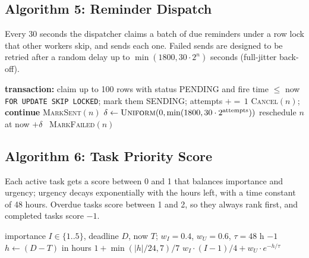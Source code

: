 \subsection{Algorithm 5: Reminder Dispatch}
Every 30 seconds the dispatcher claims a batch of due reminders under a row lock that other workers skip, and sends each one. Failed sends are designed to be retried after a random delay up to $\min(1800, 30 \cdot 2^{n})$ seconds (full-jitter back-off).
\begin{algorithm}[H]
\caption{Reminder dispatch (application/reminders/dispatcher.py)}
\begin{algorithmic}[1]
\State \textbf{transaction:} claim up to 100 rows with status PENDING and fire time $\le$ now \texttt{FOR UPDATE SKIP LOCKED}; mark them SENDING; attempts $+{=}\,1$
   \textsc{Cancel}$(n)$; \textbf{continue} \EndIf
   \textsc{MarkSent}$(n)$
  \Else
    \State $\delta \gets \textsc{Uniform}(0, \min(1800, 30 \cdot 2^{\text{attempts}}))$
     reschedule $n$ at now $+ \delta$ \Else\ \textsc{MarkFailed}$(n)$ \EndIf
  \EndIf
\EndFor
\end{algorithmic}
\end{algorithm}

\subsection{Algorithm 6: Task Priority Score}
Each active task gets a score between 0 and 1 that balances importance and urgency; urgency decays exponentially with the hours left, with a time constant of 48 hours. Overdue tasks score between 1 and 2, so they always rank first, and completed tasks score $-1$.
\begin{algorithm}[H]
\caption{Task priority score (application/tasks/maths.py)}
\begin{algorithmic}[1]
\Require importance $I \in \{1..5\}$, deadline $D$, now $T$; $w_I = 0.4$, $w_U = 0.6$, $\tau = 48$ h
 \Return $-1$ \EndIf
\State $h \gets (D - T)$ in hours
 \Return $1 + \min(|h|/24, 7)/7$ \EndIf
\State \Return $w_I \cdot (I-1)/4 + w_U \cdot e^{-h/\tau}$
\end{algorithmic}
\end{algorithm}

